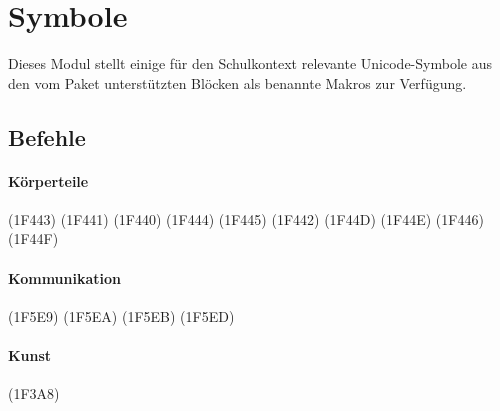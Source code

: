 \section{Symbole}
\label{modul:symbole}
Dieses Modul stellt einige für den Schulkontext relevante Unicode-Symbole aus den vom Paket  unterstützten Blöcken als benannte Makros zur Verfügung.

\subsection{Befehle}
\begin{multicols}{4}

\paragraph{Körperteile}
\begin{commands}
		{\Huge{}} (1F443)
		{\Huge{}} (1F441)
		{\Huge{}} (1F440)
		{\Huge{}} (1F444)
		{\Huge{}} (1F445)
		{\Huge{}} (1F442)
		{\Huge{}} (1F44D)
		{\Huge{}} (1F44E)
		{\Huge{}} (1F446)
		{\Huge{}} (1F44F)
	
\end{commands}

\paragraph{Kommunikation}
\begin{commands}
		{\Huge{}} (1F5E9)
		{\Huge{}} (1F5EA)
		{\Huge{}} (1F5EB)
		{\Huge{}} (1F5ED)
	
\end{commands}

\paragraph{Kunst}
\begin{commands}
		{\Huge{}} (1F3A8)
	
\end{commands}


\end{multicols}
